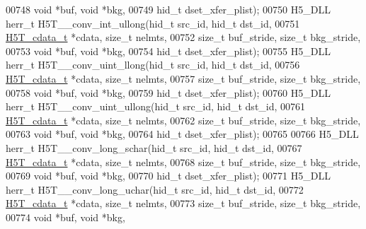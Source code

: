 \begin{DoxyCode}
00748                                   \textcolor{keywordtype}{void} *buf, \textcolor{keywordtype}{void} *bkg,
00749                                   hid\_t dset\_xfer\_plist);
00750 H5\_DLL herr\_t H5T\_\_conv\_int\_ullong(hid\_t src\_id, hid\_t dst\_id,
00751                    \hyperlink{struct_h5_t__cdata__t}{H5T\_cdata\_t} *cdata, \textcolor{keywordtype}{size\_t} nelmts,
00752                    \textcolor{keywordtype}{size\_t} buf\_stride, \textcolor{keywordtype}{size\_t} bkg\_stride,
00753                                    \textcolor{keywordtype}{void} *buf, \textcolor{keywordtype}{void} *bkg,
00754                                    hid\_t dset\_xfer\_plist);
00755 H5\_DLL herr\_t H5T\_\_conv\_uint\_llong(hid\_t src\_id, hid\_t dst\_id,
00756                    \hyperlink{struct_h5_t__cdata__t}{H5T\_cdata\_t} *cdata, \textcolor{keywordtype}{size\_t} nelmts,
00757                    \textcolor{keywordtype}{size\_t} buf\_stride, \textcolor{keywordtype}{size\_t} bkg\_stride,
00758                                    \textcolor{keywordtype}{void} *buf, \textcolor{keywordtype}{void} *bkg,
00759                                    hid\_t dset\_xfer\_plist);
00760 H5\_DLL herr\_t H5T\_\_conv\_uint\_ullong(hid\_t src\_id, hid\_t dst\_id,
00761                     \hyperlink{struct_h5_t__cdata__t}{H5T\_cdata\_t} *cdata, \textcolor{keywordtype}{size\_t} nelmts,
00762                     \textcolor{keywordtype}{size\_t} buf\_stride, \textcolor{keywordtype}{size\_t} bkg\_stride,
00763                                     \textcolor{keywordtype}{void} *buf, \textcolor{keywordtype}{void} *bkg,
00764                                     hid\_t dset\_xfer\_plist);
00765 
00766 H5\_DLL herr\_t H5T\_\_conv\_long\_schar(hid\_t src\_id, hid\_t dst\_id,
00767                    \hyperlink{struct_h5_t__cdata__t}{H5T\_cdata\_t} *cdata, \textcolor{keywordtype}{size\_t} nelmts,
00768                    \textcolor{keywordtype}{size\_t} buf\_stride, \textcolor{keywordtype}{size\_t} bkg\_stride,
00769                                    \textcolor{keywordtype}{void} *buf, \textcolor{keywordtype}{void} *bkg,
00770                                    hid\_t dset\_xfer\_plist);
00771 H5\_DLL herr\_t H5T\_\_conv\_long\_uchar(hid\_t src\_id, hid\_t dst\_id,
00772                    \hyperlink{struct_h5_t__cdata__t}{H5T\_cdata\_t} *cdata, \textcolor{keywordtype}{size\_t} nelmts,
00773                    \textcolor{keywordtype}{size\_t} buf\_stride, \textcolor{keywordtype}{size\_t} bkg\_stride,
00774                                    \textcolor{keywordtype}{void} *buf, \textcolor{keywordtype}{void} *bkg,

\end{DoxyCode}
